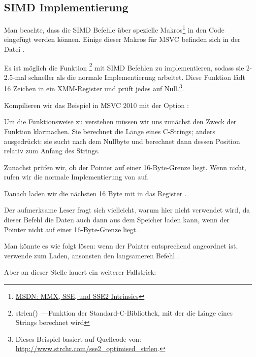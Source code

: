 \subsection{SIMD \strlen Implementierung}
\label{SIMD_strlen}

\newcommand{\URLMSDNSSE}{\href{http://msdn.microsoft.com/en-us/library/y0dh78ez(VS.80).aspx}{MSDN: MMX, SSE, und SSE2 Intrinsics}}
Man beachte, dass die \ac{SIMD} Befehle über spezielle Makros\footnote{\URLMSDNSSE} in den \CCpp Code eingefügt werden
können. Einige dieser Makros für MSVC befinden sich in der Datei .

\newcommand{\URLSTRLEN}{http://www.strchr.com/sse2_optimised_strlen}

Es ist möglich die Funktion \strlen\footnote{strlen()~---Funktion der Standard-C-Bibliothek, mit der die Länge eines
Strings berechnet wird} mit SIMD Befehlen zu implementieren, sodass sie 2-2.5-mal schneller als die normale
Implementierung arbeitet. Diese Funktion lädt 16 Zeichen in ein XMM-Register und prüft jedes auf Null.\footnote{Dieses
Beispiel basiert auf Quellcode von: \url{\URLSTRLEN}.}.



Kompilieren wir das Beispiel in MSVC 2010 mit der Option \Ox:



Um die Funktionsweise zu verstehen müssen wir uns zunächst den Zweck der Funktion klarmachen. Sie berechnet die Länge
eines C-Strings; anders ausgedrückt: sie sucht nach dem Nullbyte und berechnet dann dessen Position relativ zum Anfang
des Strings.

Zunächst prüfen wir, ob der  Pointer auf einer 16-Byte-Grenze liegt. Wenn nicht, rufen wir die normale
Implementierung von \strlen auf.

Danach laden wir die nächsten 16 Byte mit \MOVDQA in das Register .

Der aufmerksame Leser fragt sich vielleicht, warum hier \MOVDQU nicht verwendet wird, da dieser Befehl die Daten auch
dann aus dem Speicher laden kann, wenn der Pointer nicht auf einer 16-Byte-Grenze liegt.

Man könnte es wie folgt lösen: wenn der Pointer entsprechend angeordnet ist, verwende \MOVDQA zum Laden, ansonsten den
langsameren Befehl \MOVDQU.

Aber an dieser Stelle lauert ein weiterer Fallstrick:

